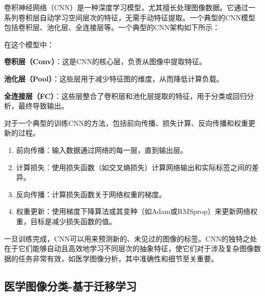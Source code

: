 卷积神经网络（CNN）是一种深度学习模型，尤其擅长处理图像数据。它通过一系列卷积层自动学习空间层次的特征，无需手动特征提取。一个典型的CNN模型包括卷积层、池化层、全连接层等\cite{DL.4}。一个典型的CNN架构如下所示：\cite{4.30 1}



在这个模型中：

\textbf{卷积层（Conv）}：这是CNN的核心层，负责从图像中提取特征。

\textbf{池化层（Pool）}：这些层用于减少特征图的维度，从而降低计算负载。

\textbf{全连接层（FC）}：这些层整合了卷积层和池化层提取的特征，用于分类或回归分析，最终导致输出。

对于一个典型的训练CNN的方法，包括前向传播、损失计算、反向传播和权重更新的过程。\cite{4.30 2}
\begin{enumerate}
    \item 前向传播：输入数据通过网络的每一层，直到输出层。
    \item 计算损失：使用损失函数（如交叉熵损失）计算网络输出和实际标签之间的差异。
    \item 反向传播：计算损失函数关于网络权重的梯度。
    \item 权重更新：使用梯度下降算法或其变种（如Adam或RMSprop）来更新网络权重，目标是减少损失函数的值。
\end{enumerate}
一旦训练完成，CNN可以用来预测新的、未见过的图像的标签。CNN的独特之处在于它们能够自动且高效地学习不同层次的抽象特征，使它们对于涉及复杂图像数据的任务非常有效，如医学图像分析，其中准确性和细节至关重要。\cite{4.30 3}

\subsection{医学图像分类-基于迁移学习}

